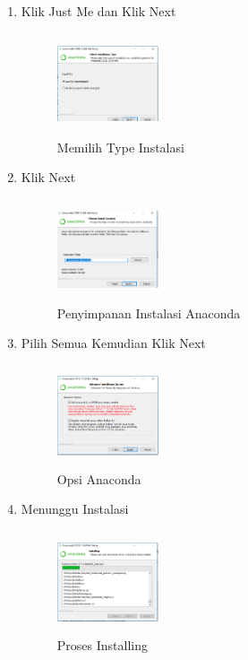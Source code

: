 \begin{enumerate}
    \item Klik Just Me dan Klik Next
    \begin{figure}[!htbp]
        \centering
        \includegraphics[width=3cm,height=3cm]{figures/gb4.png}
        \caption{Memilih Type Instalasi}
        \label{Type}
        \end{figure}

    \item Klik Next
    \begin{figure}[!htbp]
        \centering
        \includegraphics[width=3cm,height=3cm]{figures/gb5.png}
        \caption{Penyimpanan Instalasi Anaconda}
        \label{Penyimpanan}
        \end{figure}

    \item Pilih Semua Kemudian Klik Next
    \begin{figure}[!htbp]
        \centering
        \includegraphics[width=3cm,height=3cm]{figures/gb6.png}
        \caption{Opsi Anaconda}
        \label{Opsi}
        \end{figure}

    \item Menunggu Instalasi
    \begin{figure}[!htbp]
        \centering
        \includegraphics[width=3cm,height=3cm]{figures/gb7.png}
        \caption{Proses Installing}
        \label{Proses}
        \end{figure}


\end{enumerate}
